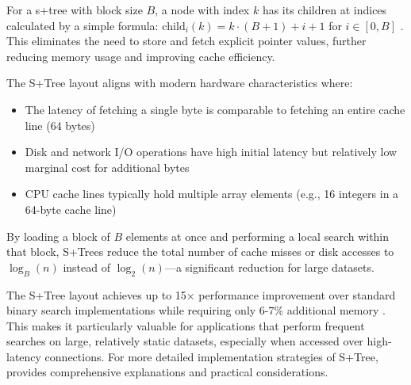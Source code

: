 For a \ac{s+tree} with block size $B$, a node with index $k$ has its children at indices calculated by a simple formula: $\text{child}_i(k) = k \cdot (B+1) + i + 1$ for $i \in [0, B]$ \citep{static_b_trees}. This eliminates the need to store and fetch explicit pointer values, further reducing memory usage and improving cache efficiency.

The S+Tree layout aligns with modern hardware characteristics where:
\begin{itemize}
  \item The latency of fetching a single byte is comparable to fetching an entire cache line (64 bytes)
  \item Disk and network I/O operations have high initial latency but relatively low marginal cost for additional bytes
  \item CPU cache lines typically hold multiple array elements (e.g., 16 integers in a 64-byte cache line)
\end{itemize}

By loading a block of $B$ elements at once and performing a local search within that block, S+Trees reduce the total number of cache misses or disk accesses to $\log_B(n)$ instead of $\log_2(n)$—a significant reduction for large datasets.

The S+Tree layout achieves up to 15× performance improvement over standard binary search implementations while requiring only 6-7\% additional memory \citep{static_b_trees}. This makes it particularly valuable for applications that perform frequent searches on large, relatively static datasets, especially when accessed over high-latency connections. For more detailed implementation strategies of S+Tree, \citet{koerkamp_2024} provides comprehensive explanations and practical considerations.